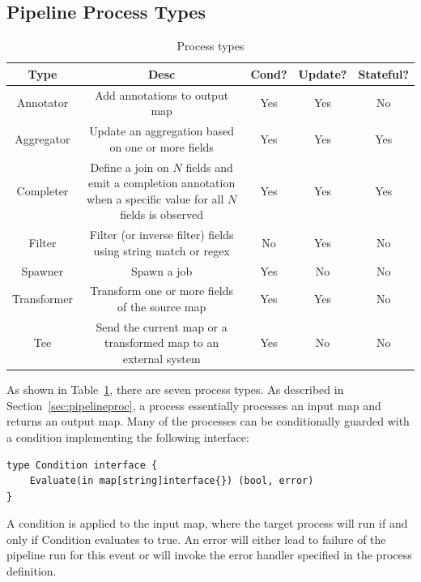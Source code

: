 \documentclass[10pt,twocolumn]{article}
\begin{document}
\subsection{Pipeline Process Types}

\begin{table}[t]
\centering
\begin{tabular}{|c|c|c|c|c|}
\hline
{\bfseries Type} & {\bfseries Desc} & {\bfseries Cond?} & {\bfseries Update?} & {\bfseries Stateful?} \\ \hline
Annotator & Add annotations to output map & Yes & Yes & No \\ \hline
Aggregator & Update an aggregation based on one or more fields & Yes & Yes & Yes \\ \hline
Completer & \makecell{Define a join on $N$ fields and emit a completion \\ annotation when a specific value for all $N$ fields is observed} & Yes & Yes & Yes \\ \hline
Filter & Filter (or inverse filter) fields using string match or regex & No & Yes & No \\ \hline
Spawner & Spawn a job & Yes & No & No \\ \hline
Transformer & Transform one or more fields of the source map & Yes & Yes & No \\ \hline
Tee & Send the current map or a transformed map to an external system & Yes & No & No \\ \hline
\end{tabular}
\caption{Process types}
\label{tab:processtypes}
\end{table}

As shown in Table~\ref{tab:processtypes}, there are seven process types.  As
described in Section~\ref{sec:pipelineproc}, a process essentially processes an
input map and returns an output map.  Many of the processes can be
conditionally guarded with a condition implementing the following interface:

\begin{lstlisting}[linewidth=\columnwidth,breaklines=true]
type Condition interface {
    Evaluate(in map[string]interface{}) (bool, error)
}
\end{lstlisting}

A condition is applied to the input map, where the target process will run if
and only if Condition evaluates to true.  An error will either lead to failure of
the pipeline run for this event or will invoke the error handler specified in the
process definition.
\end{document}
